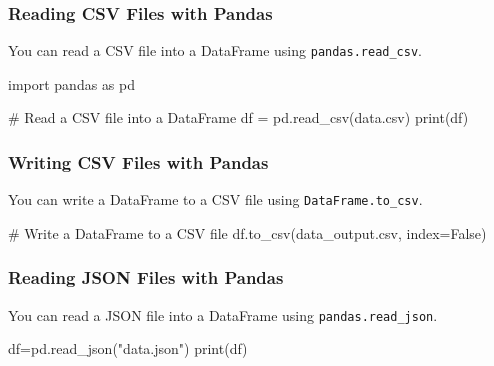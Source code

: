 \documentclass[
  letterpaper,
  DIV=11,
  numbers=noendperiod]{scrreprt}
\newenvironment{Shaded}{\begin{snugshade}}{\end{snugshade}}
\newcommand{\BuiltInTok}[1]{\textcolor[rgb]{0.00,0.23,0.31}{#1}}
\newcommand{\CommentTok}[1]{\textcolor[rgb]{0.37,0.37,0.37}{#1}}
\newcommand{\ImportTok}[1]{\textcolor[rgb]{0.00,0.46,0.62}{#1}}
\newcommand{\NormalTok}[1]{\textcolor[rgb]{0.00,0.23,0.31}{#1}}
\newcommand{\OperatorTok}[1]{\textcolor[rgb]{0.37,0.37,0.37}{#1}}
\newcommand{\StringTok}[1]{\textcolor[rgb]{0.13,0.47,0.30}{#1}}
\newcommand{\VariableTok}[1]{\textcolor[rgb]{0.07,0.07,0.07}{#1}}
\begin{document}
\subsubsection{Reading CSV Files with
Pandas}\label{reading-csv-files-with-pandas}

You can read a CSV file into a DataFrame using
\texttt{pandas.read\_csv}.

\begin{Shaded}
\begin{Highlighting}[]
\ImportTok{import}\NormalTok{ pandas }\ImportTok{as}\NormalTok{ pd}

\CommentTok{\# Read a CSV file into a DataFrame}
\NormalTok{df }\OperatorTok{=}\NormalTok{ pd.read\_csv(}\StringTok{\textquotesingle{}data.csv\textquotesingle{}}\NormalTok{)}
\BuiltInTok{print}\NormalTok{(df)}
\end{Highlighting}
\end{Shaded}

\subsubsection{Writing CSV Files with
Pandas}\label{writing-csv-files-with-pandas}

You can write a DataFrame to a CSV file using
\texttt{DataFrame.to\_csv}.

\begin{Shaded}
\begin{Highlighting}[]
\CommentTok{\# Write a DataFrame to a CSV file}
\NormalTok{df.to\_csv(}\StringTok{\textquotesingle{}data\_output.csv\textquotesingle{}}\NormalTok{, index}\OperatorTok{=}\VariableTok{False}\NormalTok{)}
\end{Highlighting}
\end{Shaded}

\subsubsection{Reading JSON Files with
Pandas}\label{reading-json-files-with-pandas}

You can read a JSON file into a DataFrame using
\texttt{pandas.read\_json}.

\begin{Shaded}
\begin{Highlighting}[]
\NormalTok{df}\OperatorTok{=}\NormalTok{pd.read\_json(}\StringTok{"data.json"}\NormalTok{)}
\BuiltInTok{print}\NormalTok{(df)}
\end{Highlighting}
\end{Shaded}
\end{document}
